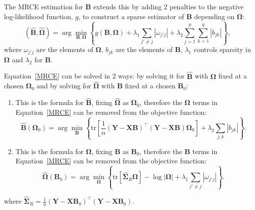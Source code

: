 \documentclass[11pt]{report} %
\begin{document}
The MRCE estimation for $\mathbf{B}$ extends this by adding 2 penalties to the negative log-likelihood function, $g$, to construct a sparse estimator of $\mathbf{B}$ depending on $\mathbf{\Omega}$:
\begin{equation}
    (\hat{\mathbf{B}}, \hat{\boldsymbol{\Omega}}) = \arg \min_{\mathbf{B}, \boldsymbol{\Omega}} \left\{ g(\mathbf{B}, \boldsymbol{\Omega}) + \lambda_1 \sum_{j' \neq j} |\omega_{j'j}| + \lambda_2 \sum_{j=1}^{p} \sum_{k=1}^{q} |b_{jk}| \right\},
    \label{MRCE}
\end{equation}
\noindent where \( \omega_{j'j} \) are the elements of \( \boldsymbol{\Omega} \), \( b_{jk} \) are the elements of \( \mathbf{B} \), \( \lambda_1 \) controls sparsity in \( \boldsymbol{\Omega} \) and \( \lambda_2 \) for \( \mathbf{B} \).\cite{rothman2010sparse} 

\noindent Equation~\ref{MRCE} can be solved in 2 ways: by solving it for \( \mathbf{\hat{B}} \) with \( \mathbf{\Omega} \) fixed at a chosen \( \mathbf{\Omega}_0 \) and by solving for \( \mathbf{\hat{\Omega}} \) with \( \mathbf{B} \) fixed at a chosen \( \mathbf{B}_0 \):

\begin{enumerate}
    \item This is the formula for \( \mathbf{\hat{B}} \), fixing \( \boldsymbol{\hat{\Omega}} \) as \( \boldsymbol{\Omega}_0 \), therefore the $\mathbf{\Omega}$ terms in Equation~\ref{MRCE} can be removed from the objective function:
        \begin{equation}
            \hat{\mathbf{B}}(\boldsymbol{\Omega}_0) = \arg \min_{\mathbf{B}} \left\{ \text{tr} \left[ \frac{1}{n} (\mathbf{Y} - \mathbf{X} \mathbf{B})^\top (\mathbf{Y} - \mathbf{X} \mathbf{B}) \boldsymbol{\Omega}_0 \right]+ \lambda_2 \sum_{j,k} |b_{jk}| \right\}.
        \label{B as Omega}
        \end{equation}
    \item This is the formula for \( \boldsymbol{\Omega} \), fixing \( \mathbf{B} \) as \( \mathbf{B}_0 \), therefore the $\mathbf{B}$ terms in Equation~\ref{MRCE} can be removed from the objective function:
        \begin{equation}
            \hat{\boldsymbol{\Omega}}(\mathbf{B}_0) = \arg \min_{\boldsymbol{\Omega}} \left\{ \text{tr} \left[ \hat{\mathbf{\Sigma}}_R \boldsymbol{\Omega} \right] - \log |\boldsymbol{\Omega}| + \lambda_1 \sum_{j' \neq j} |\omega_{j'j}| \right\}.
        \label{Omega as B}
        \end{equation}
\end{enumerate}
\noindent where $\hat{\mathbf{\Sigma}}_R=\frac{1}{n} (\mathbf{Y} - \mathbf{X} \mathbf{B}_0)^\top (\mathbf{Y} - \mathbf{X} \mathbf{B}_0)$.
\end{document}
